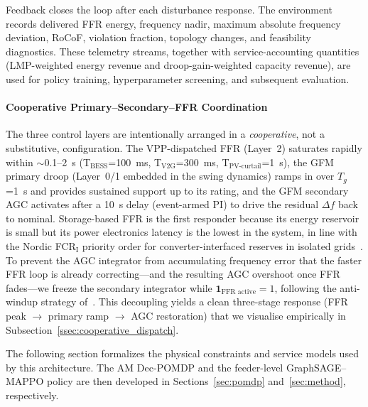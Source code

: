 Feedback closes the loop after each disturbance response. The
environment records delivered FFR energy, frequency nadir, maximum
absolute frequency deviation, RoCoF, violation fraction, topology
changes, and feasibility diagnostics. These telemetry streams, together
with service-accounting quantities (LMP-weighted energy revenue and
droop-gain-weighted capacity revenue), are used for policy training,
hyperparameter screening, and subsequent evaluation.

\paragraph{Cooperative Primary--Secondary--FFR Coordination}
The three control layers are intentionally arranged in a
\emph{cooperative}, not a substitutive, configuration. The VPP-dispatched
FFR (Layer~2) saturates rapidly within $\sim$0.1--2~s (T$_{\text{BESS}}$=100~ms,
T$_{\text{V2G}}$=300~ms, T$_{\text{PV-curtail}}$=1~s), the GFM primary droop
(Layer~0/1 embedded in the swing dynamics) ramps in over $T_g$=1~s and
provides sustained support up to its rating, and the GFM secondary AGC
activates after a 10~s delay (event-armed PI) to drive the residual
$\Delta f$ back to nominal. Storage-based FFR is the first responder
because its energy reservoir is small but its power electronics latency
is the lowest in the system, in line with the Nordic
FCR$_{\text{I}}$ priority order for converter-interfaced reserves in
isolated grids~\cite{mota2024fcri,papakonstantinou2021bessagc}. To
prevent the AGC integrator from accumulating frequency error that the
faster FFR loop is already correcting---and the resulting AGC overshoot
once FFR fades---we freeze the secondary integrator while
$\mathbf{1}_{\text{FFR active}}=1$, following the anti-windup
strategy of~\cite{subotic2023dualportgfm}. This decoupling yields a
clean three-stage response (FFR peak $\rightarrow$ primary ramp
$\rightarrow$ AGC restoration) that we visualise empirically in
Subsection~\ref{ssec:cooperative_dispatch}.

The following
section formalizes the physical constraints and service models used by
this architecture. The AM Dec-POMDP and the feeder-level
GraphSAGE--MAPPO policy are then developed in
Sections~\ref{sec:pomdp} and~\ref{sec:method}, respectively.
